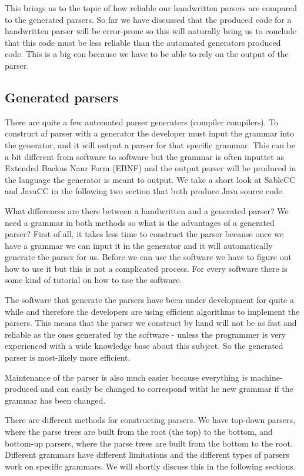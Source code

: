 This brings us to the topic of how reliable our handwritten parsers are compared to the generated parsers. So far we have discussed that the produced code for a handwritten parser will be error-prone so this will naturally bring us to conclude that this code must be less reliable than the automated generators produced code. This is a big con because we have to be able to rely on the output of the parser.

\subsection{Generated parsers}
\label{sec:ana-genparser}
There are quite a few automated parser generaters (compiler compilers). To construct af parser with a generator the developer must input the grammar into the generator, and it will output a parser for that specific grammar. This can be a bit different from software to software but the grammar is often inputtet as Extended Backus Naur Form (EBNF) and the output parser will be produced in the language the generator is meant to output. We take a short look at SableCC and JavaCC in the following two section that both produce Java source code.

What differences are there between a handwritten and a generated parser? We need a grammar in both methods so what is the advantages of a generated parser? First of all, it takes less time to construct the parser because once we have a grammar we can input it in the generator and it will automatically generate the parser for us. Before we can use the software we have to figure out how to use it but this is not a complicated process. For every software there is some kind of tutorial on how to use the software.

The software that generate the parsers have been under development for quite a while and therefore the developers are using efficient algorithms to implement the parsers. This means that the parser we construct by hand will not be as fast and reliable as the ones generated by the software - unless the programmer is very experienced with a wide knowledge base about this subject. So the generated parser is most-likely more efficient.

Maintenance of the parser is also much easier because everything is machine-produced and can easily be changed to correspond witht he new grammar if the grammar has been changed.

There are different methods for constructing parsers. We have top-down parsers, where the parse trees are built from the root (the top) to the bottom, and bottom-up parsers, where the parse trees are built from the bottom to the root. Different grammars have different limitations and  the different types of parsers work on specific grammars. We will shortly discuss this in the following sections.

